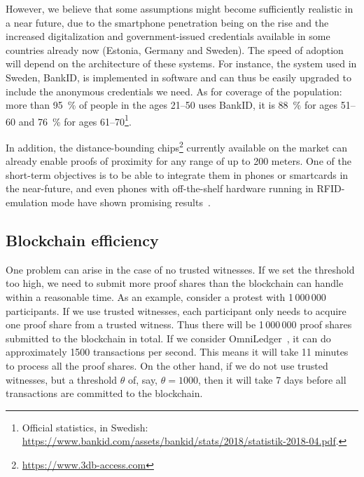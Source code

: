 However, we believe that some assumptions might become sufficiently
realistic in a near future, due to the smartphone penetration being on
the rise and the increased digitalization and government-issued
credentials available in some countries already now (\eg Estonia,
Germany and Sweden). The speed of adoption will depend on the architecture of these systems.
For instance, the system used in Sweden, BankID, is implemented in software and 
can thus be easily upgraded to include the anonymous credentials we need.
As for coverage of the population: more than \SI{95}{\%} of people in the ages 
21--50 uses BankID, it is \SI{88}{\%} for ages 51--60 and \SI{76}{\%} for ages 
61--70\footnote{%
  Official statistics, in Swedish:
  \url{https://www.bankid.com/assets/bankid/stats/2018/statistik-2018-04.pdf}.
}.

In addition, the distance-bounding chips\footnote{\url{https://www.3db-access.com}} currently available on the market can already enable proofs of proximity for any range of up to 200 meters.
One of the short-term objectives is to be able to integrate them in phones or smartcards in the near-future, and even phones with off-the-shelf hardware running in RFID-emulation mode have shown promising results~\cite{DBonSmartphones}.





\subsection{Blockchain efficiency}
One problem can arise in the case of no trusted witnesses.
If we set the threshold too high, we need to submit more proof shares than the 
blockchain can handle within a reasonable time.
As an example, consider a protest with 1\,000\,000 participants.
If we use trusted witnesses, each participant only needs to acquire one proof 
share from a trusted witness.
Thus there will be 1\,000\,000 proof shares submitted to the blockchain in 
total.
If we consider OmniLedger~\cite{OmniLedger}, it can do approximately 1500 
transactions per second.
This means it will take 11 minutes to process all the proof shares.
On the other hand, if we do not use trusted witnesses, but a threshold 
\(\theta\) of, say, \(\theta = 1000\), then it will take 7 days before all 
transactions are committed to the blockchain.


